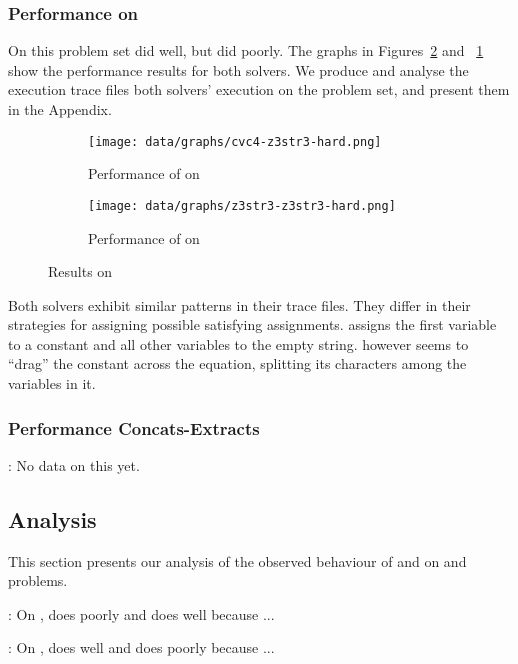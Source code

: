 
        \subsubsection{Performance on \zHard{}}

            On this problem set \cvc{} did well, but \us{} did poorly. The graphs in Figures~\ref{fig:z3str3-z3str3-hard} and ~\ref{fig:cvc4-z3str3-hard} show the performance results for both solvers. We produce and analyse the execution trace files both solvers' execution on the problem set, and present them in the Appendix.

            \begin{figure}[h]
                \begin{subfigure}{.5\textwidth}
                    \texttt{[image: data/graphs/cvc4-z3str3-hard.png]}
                    \caption{Performance of \cvc{} on \zHard{}}
                    \label{fig:cvc4-z3str3-hard}
                \end{subfigure}
                \begin{subfigure}{.5\textwidth}
                    \texttt{[image: data/graphs/z3str3-z3str3-hard.png]}
                    \caption{Performance of \us{} on \zHard{}}
                    \label{fig:z3str3-z3str3-hard}
                \end{subfigure}
                \caption{Results on \zHard}
                \label{fig:z3str3-hard}
            \end{figure}

            Both solvers exhibit similar patterns in their trace files. They differ in their strategies for assigning possible satisfying assignments. \cvc{} assigns the first variable to a constant and all other variables to the empty string. \us{} however seems to ``drag'' the constant across the equation, splitting its characters among the variables in it.


        \subsubsection{Performance Concats-Extracts}

            \todo{}: No data on this yet.

    \subsection{Analysis}

        This section presents our analysis of the observed behaviour of \cvc{} and \us{} on \cHard{} and \zHard{} problems.

        \todo{}: On \cHard{}, \cvc{} does poorly and \us{} does well because ...

        \todo{}: On \zHard{}, \cvc{} does well and \us{} does poorly because ...
